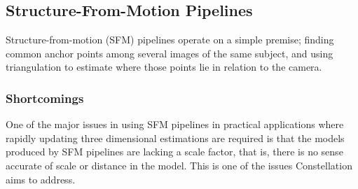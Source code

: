 \subsection{Structure-From-Motion Pipelines}

Structure-from-motion (SFM) pipelines operate on a simple premise; finding common anchor points among several images of the same subject, and using triangulation to estimate where those points lie in relation to the camera.
\subsubsection{Shortcomings}
One of the major issues in using SFM pipelines in practical applications where rapidly updating three dimensional estimations are required is that the models produced by SFM pipelines are lacking a scale factor, that is, there is no sense accurate of scale or distance in the model. This is one of the issues Constellation aims to address.